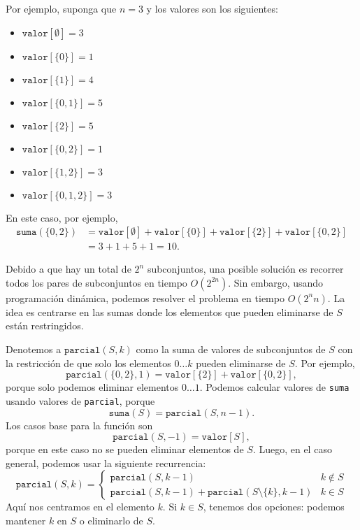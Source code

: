 Por ejemplo, suponga que $n=3$ y los valores son los siguientes:
\begin{multicols}{2}
    \begin{itemize}
        \item $\texttt{valor}[\emptyset] = 3$
        \item $\texttt{valor}[\{0\}] = 1$
        \item $\texttt{valor}[\{1\}] = 4$
        \item $\texttt{valor}[\{0,1\}] = 5$
        \item $\texttt{valor}[\{2\}] = 5$
        \item $\texttt{valor}[\{0,2\}] = 1$
        \item $\texttt{valor}[\{1,2\}] = 3$
        \item $\texttt{valor}[\{0,1,2\}] = 3$
    \end{itemize}
\end{multicols}
En este caso, por ejemplo,
\begin{equation*}
    \begin{split}
        \texttt{suma}(\{0,2\}) &= \texttt{valor}[\emptyset]+\texttt{valor}[\{0\}]+\texttt{valor}[\{2\}]+\texttt{valor}[\{0,2\}] \\
        &= 3 + 1 + 5 + 1 = 10.
    \end{split}
\end{equation*}

Debido a que hay un total de $2^n$ subconjuntos,
una posible solución es recorrer todos
los pares de subconjuntos en tiempo $O(2^{2n})$.
Sin embargo, usando programación dinámica, podemos
resolver el problema en tiempo $O(2^n n)$.
La idea es centrarse en las sumas donde los
elementos que pueden eliminarse de $S$ están restringidos.

Denotemos a $\texttt{parcial}(S,k)$ como la suma de
valores de subconjuntos de $S$ con la restricción
de que solo los elementos $0 \ldots k$
pueden eliminarse de $S$.
Por ejemplo,
\[\texttt{parcial}(\{0,2\},1)=\texttt{valor}[\{2\}]+\texttt{valor}[\{0,2\}],\]
porque solo podemos eliminar elementos $0 \ldots 1$.
Podemos calcular valores de \texttt{suma} usando
valores de \texttt{parcial}, porque
\[\texttt{suma}(S) = \texttt{parcial}(S,n-1).\]
Los casos base para la función son
\[\texttt{parcial}(S,-1)=\texttt{valor}[S],\]
porque en este caso no se pueden eliminar elementos de $S$.
Luego, en el caso general, podemos usar la siguiente recurrencia:
\begin{equation*}
    \texttt{parcial}(S,k) = \begin{cases}
        \texttt{parcial}(S,k-1)                                           & k \notin S \\
        \texttt{parcial}(S,k-1) + \texttt{parcial}(S \setminus \{k\},k-1) & k \in S
    \end{cases}
\end{equation*}
Aquí nos centramos en el elemento $k$.
Si $k \in S$, tenemos dos opciones: podemos mantener $k$ en $S$
o eliminarlo de $S$.

